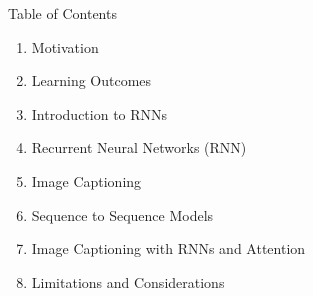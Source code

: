 \begin{frame}[allowframebreaks]{Table of Contents}
\begin{enumerate}
    \item Motivation
    \item Learning Outcomes
    \item Introduction to RNNs
    \item Recurrent Neural Networks (RNN)
    \item Image Captioning
    \item Sequence to Sequence Models
    \item Image Captioning with RNNs and Attention
    \item Limitations and Considerations
\end{enumerate}
\end{frame}